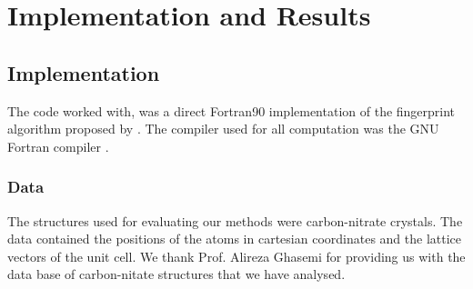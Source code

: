 
\chapter{Implementation and Results} %

\label{Chapter2} %


\section{Implementation}
The code  worked  with, was a direct Fortran90 implementation of the fingerprint algorithm proposed by \cite{Zhu2016}. The compiler used for all computation was the GNU Fortran compiler \cite{gnufortran}.

\subsection{Data}
The structures used for evaluating our methods were carbon-nitrate crystals. The data contained the positions of the atoms in cartesian coordinates and the lattice vectors of the unit cell. We thank Prof. Alireza Ghasemi for providing us with the data base of carbon-nitate structures that we have analysed.


